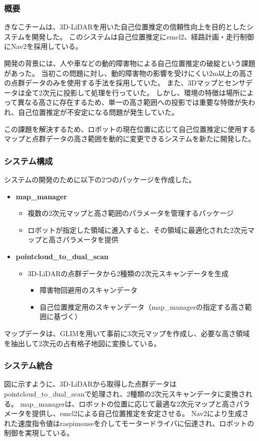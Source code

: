 \subsubsection{概要}
きなこチームは、3D-LiDARを用いた自己位置推定の信頼性向上を目的としたシステムを開発した。
このシステムは自己位置推定にemcl2、経路計画・走行制御にNav2を採用している。

開発の背景には、人や車などの動的障害物による自己位置推定の破綻という課題があった。
当初この問題に対し、動的障害物の影響を受けにくい2m以上の高さの点群データのみを使用する手法を採用していた。
また、3Dマップとセンサデータは全て2次元に投影して処理を行っていた。
しかし、環境の特徴は場所によって異なる高さに存在するため、単一の高さ範囲への投影では重要な特徴が失われ、自己位置推定が不安定になる問題が発生していた。

この課題を解決するため、ロボットの現在位置に応じて自己位置推定に使用するマップと点群データの高さ範囲を動的に変更できるシステムを新たに開発した。

\subsubsection{システム構成}
システムの開発のために以下の2つのパッケージを作成した。

\begin{itemize}
  \item \textbf{map\_manager}
    \begin{itemize}
      \item 複数の2次元マップと高さ範囲のパラメータを管理するパッケージ
      \item ロボットが指定した領域に進入すると、その領域に最適化された2次元マップと高さパラメータを提供
    \end{itemize}
  \item \textbf{pointcloud\_to\_dual\_scan}
    \begin{itemize}
      \item 3D-LiDARの点群データから2種類の2次元スキャンデータを生成
        \begin{itemize}
          \item 障害物回避用のスキャンデータ
          \item 自己位置推定用のスキャンデータ（map\_managerの指定する高さ範囲に基づく）
        \end{itemize}
    \end{itemize}
\end{itemize}

マップデータは、GLIMを用いて事前に3次元マップを作成し、必要な高さ領域を抽出して2次元の占有格子地図に変換している。


\subsubsection{システム統合}
図に示すように、3D-LiDARから取得した点群データはpointcloud\_to\_dual\_scanで処理され、2種類の2次元スキャンデータに変換される。
map\_managerは、ロボットの位置に応じて最適な2次元マップと高さパラメータを提供し、emcl2による自己位置推定を安定させる。
Nav2により生成された速度指令値はraspimouseを介してモータードライバに伝達され、ロボットの制御を実現している。